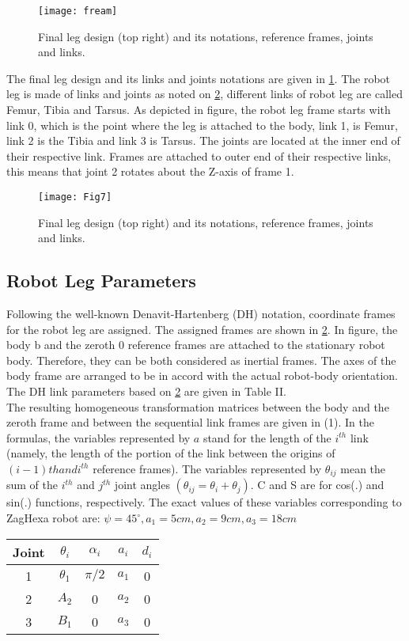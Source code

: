 \begin{figure}[h]
	\centering
	\texttt{[image: fream]}
	\caption{  Final leg design (top right) and its notations, reference frames, joints and links.}
	\label{fream}
\end{figure}

The final leg design and its links and joints notations are given in \ref{fream}. The robot leg is made of links and joints as noted on \ref{leg}, different links of robot leg are called Femur, Tibia and Tarsus. As depicted in figure, the robot leg frame starts with link 0, which is the point where the leg is attached to the body, link 1, is Femur, link 2 is the Tibia and link 3 is Tarsus. The joints are located at the inner end of their respective link. Frames are attached to outer end of their respective links, this means that joint 2 rotates about the Z-axis of frame 1.

\begin{figure}[h]
	\centering
	\texttt{[image: Fig7]}
	\caption{  Final leg design (top right) and its notations, reference frames, joints and links.}
	\label{leg}
\end{figure}

\subsection{Robot Leg Parameters}
Following the well-known Denavit-Hartenberg (DH) notation, coordinate frames for the robot leg are assigned. The assigned frames are shown in \ref{leg}. In figure, the body {b} and the zeroth {0} reference frames are attached to the stationary robot body. Therefore, they can be both considered as inertial frames. The axes of the body frame are arranged to be in accord with the actual robot-body orientation. The DH link parameters based on \ref{leg} are given in Table II.\\

The resulting homogeneous transformation matrices between the body and the zeroth frame and between the sequential link frames are given in (1).  In the formulas, the variables represented by $a$ stand for the length of the $i^{th}$ link (namely, the length of the portion of the link between the origins of $(i-1) th and i^{th}$ reference frames). The variables represented by $\theta_{ij}$ mean the sum of the $i^{th}$ and $j^{th}$ joint angles $(\theta_{ij}=\theta_i+\theta_j)$. C and S are for cos(.) and sin(.) functions, respectively.  The exact values of these variables corresponding to ZagHexa robot are: 
$\psi = 45^\circ, a_1= 5cm, a_2= 9cm, a_3= 18cm$
\begin{center}
\begin{tabular}{|c||c|c|c|c|}
	\hline
	Joint & $\theta_i$ & $\alpha_i$ & $a_i$ & $d_i$ \\ \hline
	1&		$\theta_1$ & $\pi/2$	& $a_1$ & 0 \\ \hline
	2&		$A_2$ & 0			& $a_2$ & 0 \\ \hline
	3&		$B_1$ & 0			& $a_3$ & 0 \\ \hline
\end{tabular}
\end{center}


